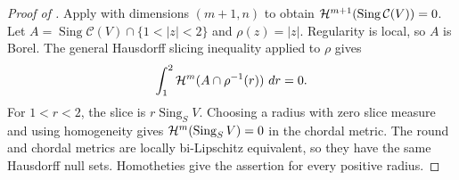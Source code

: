 \begin{proof}[Proof of ]
Apply  with dimensions $(m+1,n)$ to obtain
$\mathcal H^{m+1}(\operatorname{Sing}\mathcal C(V))=0$. Let
$A=\operatorname{Sing}\mathcal C(V)\cap\{1<|z|<2\}$ and $\rho(z)=|z|$.
Regularity is local, so $A$ is Borel. The general Hausdorff slicing
inequality \cite[Chapter~2, \S1, Theorem~1.10]{Simon2018} applied to $\rho$
gives
\[
 \int_1^2\mathcal H^m(A\cap\rho^{-1}(r))\,\mathop{}\!d r=0.
\]
For $1<r<2$, the slice is $r\operatorname{Sing}_S V$. Choosing a radius with
zero slice measure and using homogeneity gives $\mathcal H^m(\operatorname{Sing}_S V)=0$ in the chordal
metric. The round and chordal metrics are locally bi-Lipschitz equivalent,
so they have the same Hausdorff null sets. Homotheties give the assertion for
every positive radius.
\end{proof}
